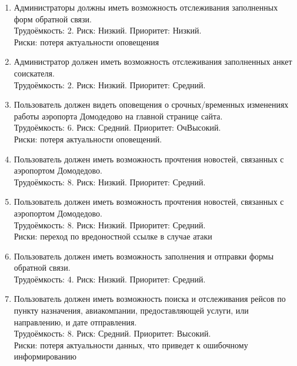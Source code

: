 \begin{enumerate}
    \item Администраторы должны иметь возможность отслеживания
          заполненных форм обратной связи. \\
          Трудоёмкость: 2. Риск: Низкий. Приоритет: Низкий. \\
          Риски: потеря актуальности оповещения

    \item Администратор должен иметь возможность отслеживания
          заполненных анкет соискателя. \\
          Трудоёмкость: 2. Риск: Низкий. Приоритет: Средний.

    \item Пользователь должен видеть оповещения о срочных/временных
          изменениях работы аэропорта Домодедово на главной странице сайта. \\
          Трудоёмкость: 6. Риск: Средний. Приоритет: ОчВысокий. \\
          Риски: потеря актуальности оповещений.
          
    \item Пользователь должен иметь возможность прочтения новостей,
          связанных с аэропортом Домодедово. \\
          Трудоёмкость: 8. Риск: Низкий. Приоритет: Средний.

    \item Пользователь должен иметь возможность прочтения новостей,
          связанных с аэропортом Домодедово. \\
          Трудоёмкость: 8. Риск: Низкий. Приоритет: Средний. \\
          Риски: переход по вредоностной ссылке в случае атаки

    \item Пользователь должен иметь возможность заполнения и 
          отправки формы обратной связи. \\
          Трудоёмкость: 4. Риск: Низкий. Приоритет: Средний.

    \item Пользователь должен иметь возможность поиска и отслеживания 
          рейсов по пункту назначения, авиакомпании, предоставляющей услуги, 
          или направлению, и дате отправления. \\
          Трудоёмкость: 8. Риск: Средний. Приоритет: Высокий. \\
          Риски: потеря актуальности данных, что приведет к 
          ошибочному информированию


\end{enumerate}

